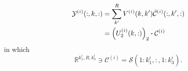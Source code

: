 \documentclass[journal]{IEEEtran}
\begin{document}
{	\begin{align}
	{\mathcal{Y}}^{(i)}(:,k,:) &= \sum_{k'}^{R} V^{(i)}(k,k')\bar{\mathcal{C}}^{(i)}(:,k',:) \notag
	\\&= \left( U_{2}^{(i)}(k,:)\right)_2 \boldsymbol{\cdot} {\mathcal{C}}^{(i)}
	\end{align}
	in which 
	\[
	\mathbb{R}^{k_1^i,R,k_3^i}\ni {\mathcal{C}}^{(i)} = \mathcal{S}(1:k_1^i,:,1:k_3^i).
	\]
	
}
\end{document}
